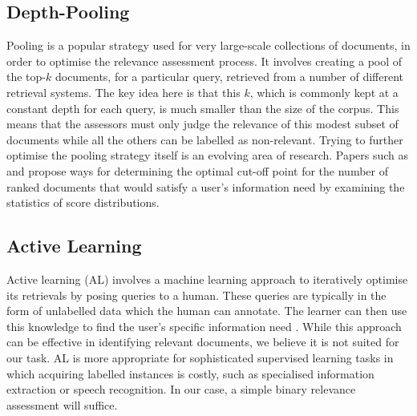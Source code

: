 \documentclass{l4proj}
\begin{document}
\subsection{Depth-Pooling}
\label{sec:background_pooling}
Pooling is a popular strategy used for very large-scale collections of documents, in order to optimise the relevance assessment process. It involves creating a pool of the top-$k$ documents, for a particular query, retrieved from a number of different retrieval systems. The key idea here is that this $k$, which is commonly kept at a constant depth for each query, is much smaller than the size of the corpus. This means that the assessors must only judge the relevance of this modest subset of documents while all the others can be labelled as non-relevant. Trying to further optimise the pooling strategy itself is an evolving area of research. Papers such as \cite{arampatzis2009stop} and \cite{lien2019assumption} propose ways for determining the optimal cut-off point for the number of ranked documents that would satisfy a user's information need by examining the statistics of score distributions.


\subsection{Active Learning}
Active learning (AL) involves a machine learning approach to iteratively optimise its retrievals by posing queries to a human. These queries are typically in the form of unlabelled data which the human can annotate. The learner can then use this knowledge to find the user's specific information need \citep{burr2012al}. While this approach can be effective in identifying relevant documents, we believe it is not suited for our task. AL is more appropriate for sophisticated supervised learning tasks in which acquiring labelled instances is costly, such as specialised information extraction or speech recognition. In our case, a simple binary relevance assessment will suffice.
\end{document}
